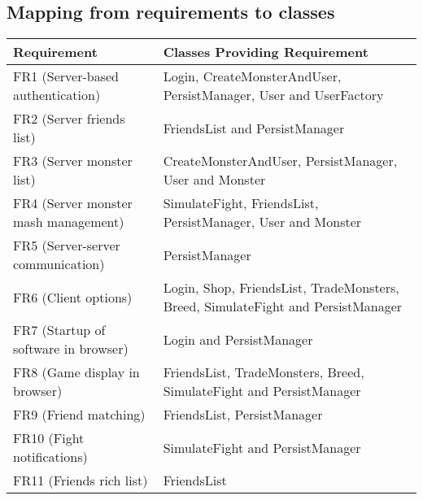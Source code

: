 \subsection{Mapping from requirements to classes}
\begin{tabular}{| l | l |}
\hline
Requirement & Classes Providing Requirement \\
\hline
FR1 (Server-based authentication) & Login, CreateMonsterAndUser, PersistManager, User and UserFactory \\
\hline
FR2 (Server friends list) & FriendsList and PersistManager \\
\hline
FR3 (Server monster list) & CreateMonsterAndUser, PersistManager, User and Monster \\
\hline
FR4 (Server monster mash management) & SimulateFight, FriendsList, PersistManager, User and Monster \\
\hline
FR5 (Server-server communication) & PersistManager \\
\hline
FR6 (Client options) & Login, Shop, FriendsList, TradeMonsters, Breed, SimulateFight and PersistManager \\
\hline
FR7 (Startup of software in browser) & Login and PersistManager \\
\hline
FR8 (Game display in browser) & FriendsList, TradeMonsters, Breed, SimulateFight and PersistManager \\
\hline
FR9 (Friend matching) & FriendsList, PersistManager \\
\hline
FR10 (Fight notifications) & SimulateFight and PersistManager \\
\hline
FR11 (Friends rich list) & FriendsList \\
\hline
\end{tabular}